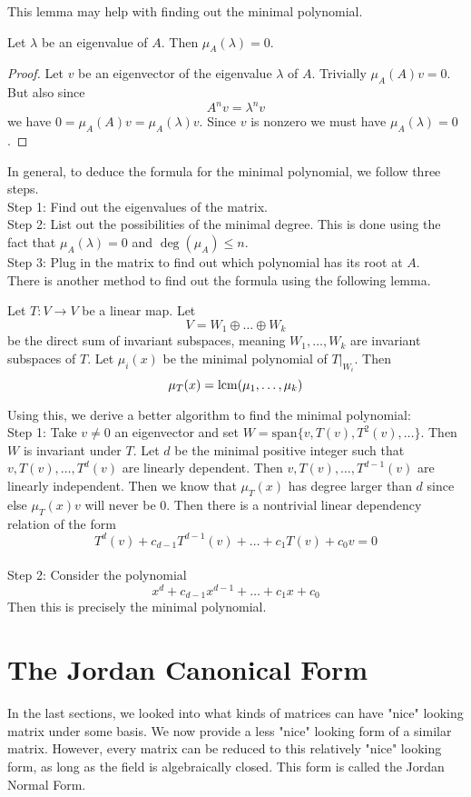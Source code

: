 \documentclass[a4paper]{article}
\begin{document}
This lemma may help with finding out the minimal polynomial. 

\begin{lmm}{}{} Let $\lambda$ be an eigenvalue of $A$. Then $\mu_A(\lambda)=0$. 
\begin{proof}
Let $v$ be an eigenvector of the eigenvalue $\lambda$ of $A$. Trivially $\mu_A(A)v=0$. But also since $$A^nv=\lambda^nv$$ we have $0=\mu_A(A)v=\mu_A(\lambda)v$. Since $v$ is nonzero we must have $\mu_A(\lambda)=0$. 
\end{proof}
\end{lmm}

In general, to deduce the formula for the minimal polynomial, we follow three steps. \\
Step 1: Find out the eigenvalues of the matrix. \\
Step 2: List out the possibilities of the minimal degree. This is done using the fact that $\mu_A(\lambda)=0$ and $\deg(\mu_A)\leq n$. \\
Step 3: Plug in the matrix to find out which polynomial has its root at $A$. \\
There is another method to find out the formula using the following lemma. 

\begin{lmm}{}{} Let $T:V\to V$ be a linear map. Let $$V=W_1\oplus\dots\oplus W_k$$ be the direct sum of invariant subspaces, meaning $W_1,\dots,W_k$ are invariant subspaces of $T$. Let $\mu_i(x)$ be the minimal polynomial of $T|_{W_i}$. Then $$\mu_T(x)=\operatorname{lcm}(\mu_1,\dots,\mu_k)$$
\end{lmm}

Using this, we derive a better algorithm to find the minimal polynomial: \\
Step 1: Take $v\neq 0$ an eigenvector and set $W=\text{span}\{v,T(v),T^2(v),\dots\}$. Then $W$ is invariant under $T$. Let $d$ be the minimal positive integer such that $v,T(v),\dots,T^d(v)$ are linearly dependent. Then $v,T(v),\dots,T^{d-1}(v)$ are linearly independent. Then we know that $\mu_T(x)$ has degree larger than $d$ since else $\mu_T(x)v$ will never be $0$. Then there is a nontrivial linear dependency relation of the form $$T^d(v)+c_{d-1}T^{d-1}(v)+\dots+c_1T(v)+c_0v=0$$\\
Step 2: Consider the polynomial $$x^d+c_{d-1}x^{d-1}+\dots+c_1x+c_0$$ Then this is precisely the minimal polynomial. 

\pagebreak
\section{The Jordan Canonical Form}
In the last sections, we looked into what kinds of matrices can have "nice" looking matrix under some basis. We now provide a less "nice" looking form of a similar matrix. However, every matrix can be reduced to this relatively "nice" looking form, as long as the field is algebraically closed. This form is called the Jordan Normal Form. 
\end{document}
